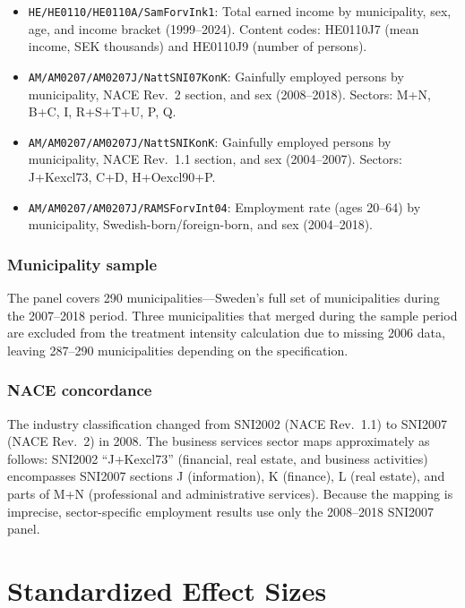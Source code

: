 \documentclass[12pt]{article}
\begin{document}
\begin{itemize}
\item \texttt{HE/HE0110/HE0110A/SamForvInk1}: Total earned income by municipality, sex, age, and income bracket (1999--2024). Content codes: HE0110J7 (mean income, SEK thousands) and HE0110J9 (number of persons).

\item \texttt{AM/AM0207/AM0207J/NattSNI07KonK}: Gainfully employed persons by municipality, NACE Rev.~2 section, and sex (2008--2018). Sectors: M+N, B+C, I, R+S+T+U, P, Q.

\item \texttt{AM/AM0207/AM0207J/NattSNIKonK}: Gainfully employed persons by municipality, NACE Rev.~1.1 section, and sex (2004--2007). Sectors: J+Kexcl73, C+D, H+Oexcl90+P.

\item \texttt{AM/AM0207/AM0207J/RAMSForvInt04}: Employment rate (ages 20--64) by municipality, Swedish-born/foreign-born, and sex (2004--2018).
\end{itemize}

\subsubsection*{Municipality sample} The panel covers 290 municipalities---Sweden's full set of municipalities during the 2007--2018 period. Three municipalities that merged during the sample period are excluded from the treatment intensity calculation due to missing 2006 data, leaving 287--290 municipalities depending on the specification.

\subsubsection*{NACE concordance} The industry classification changed from SNI2002 (NACE Rev.~1.1) to SNI2007 (NACE Rev.~2) in 2008. The business services sector maps approximately as follows: SNI2002 ``J+Kexcl73'' (financial, real estate, and business activities) encompasses SNI2007 sections J (information), K (finance), L (real estate), and parts of M+N (professional and administrative services). Because the mapping is imprecise, sector-specific employment results use only the 2008--2018 SNI2007 panel.


\section{Standardized Effect Sizes}
\label{sec:sde}


\end{document}
